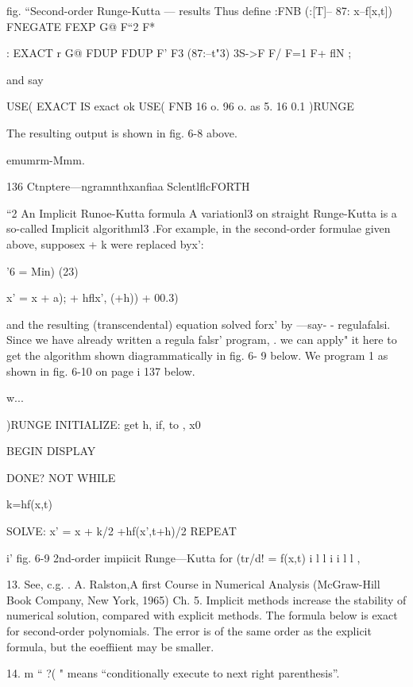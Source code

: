{ 

fig. “Second-order Runge-Kutta — results
Thus define
:FNB (:[T]-- 87: x--f[x,t])
FNEGATE FEXP G@ F“2 F*

: EXACT r G@ FDUP FDUP F' F3 (87:--t"3)
3S->F F/ F=1 F+ flN ;

and say

USE( EXACT IS exact ok
USE( FNB 16 o. 96 o. as 5. 16 0.1 )RUNGE

The resulting output is shown in fig. 6-8 above.

emumrm-Mmm.

136 Ctnptere—ngramnthxanfiaa SclentlflcFORTH

“2 An Implicit Runoe-Kutta formula
A variationl3 on straight Runge-Kutta is a so-called Implicit
algorithml3 .For example, in the second-order formulae given
above, supposex + k were replaced byx’:

’6 = Min) (23)

x’ = x + a); + hflx’, (+h)) + 00.3)

and the resulting (transcendental) equation solved forx’ by —say- -
regulafalsi. Since we have already written a regula falsr' program, .
we can apply" it here to get the algorithm shown diagrammatically
in fig. 6- 9 below. We program 1 as shown in fig. 6-10 on page i
137 below.

w...

 

 

)RUNGE
INITIALIZE: get h, if, to , x0

BEGIN DISPLAY

DONE? NOT
WHILE

k=hf(x,t)

SOLVE: x' = x + k/2 +hf(x’,t+h)/2
REPEAT

 

 

 

i’
fig. 6-9 2nd-order impiicit Runge—Kutta for (tr/d! = f(x,t) i
l
l
i
i
l
l
,

 

13. See, c.g. . A. Ralston,A first Course in Numerical Analysis (McGraw-Hill Book Company, New
York, 1965) Ch. 5. Implicit methods increase the stability of numerical solution, compared with
explicit methods. The formula below is exact for second-order polynomials. The error is of the
same order as the explicit formula, but the eoeffiient may be smaller.

14. m “ ?( " means “conditionally execute to next right parenthesis”.

}
